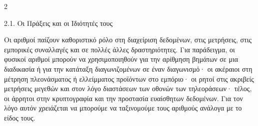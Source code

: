 \begin{ylh}{2}
    \item 2.1. Οι Πράξεις και οι Ιδιότητές τους
\end{ylh}
Οι αριθμοί παίζουν καθοριστικό ρόλο στη διαχείριση δεδομένων, στις μετρήσεις, στις εμπορικές συναλλαγές και σε πολλές άλλες δραστηριότητες. Για παράδειγμα, οι φυσικοί αριθμοί μπορούν να χρησιμοποιηθούν για την αρίθμηση βημάτων σε μια διαδικασία ή για την κατάταξη διαγωνιζομένων σε έναν διαγωνισμό· οι ακέραιοι στη μέτρηση πλεονάσματος ή ελλείμματος προϊόντων στο εμπόριο· οι ρητοί στις ακριβείς μετρήσεις μεγεθών και στον λόγο διαστάσεων των οθονών των τηλεοράσεων· τέλος, οι άρρητοι στην κρυπτογραφία και την προστασία ευαίσθητων δεδομένων. Για τον λόγο αυτόν χρειάζεται να μπορούμε να ταξινομούμε τους αριθμούς ανάλογα με το είδος τους.

